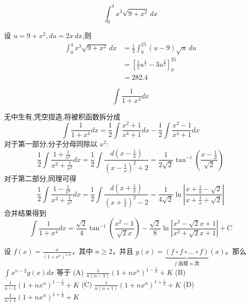 \begin{questions}
    \question
    \[
    \int_{0}^{4} x^3 \sqrt{9+x^2} \,dx
    \]
    \begin{solution}
        设 $u = 9+x^2, du = 2x \,dx$,则
        \begin{align*}
        \int_{0}^{4} x^3 \sqrt{9+x^2}\,dx 
        &= \frac{1}{2} \int_{9}^{25} (u-9) \sqrt{u}\, du \\
        &= \left[ \frac{1}{5}u^{\frac{5}{2}} - 3u^{\frac{3}{2}} \right]_{9}^{25} \\
        &= 282.4
        \end{align*}
    \end{solution}

    \question
    \[ 
    \int \frac{1}{1+x^4} dx 
    \]
    \begin{solution}
        无中生有,凭空捏造,将被积函数拆分成
        \[ 
        \int \frac{1}{1+x^4} dx = \frac{1}{2} \int \frac{x^2+1}{x^4+1} dx - \frac{1}{2} \int \frac{x^2-1}{x^4+1} dx 
        \]
        对于第一部分,分子分母同除以 $x^2$:
        \[ 
        \frac{1}{2} \int \frac{1+\frac{1}{x^2}}{x^2+\frac{1}{x^2}} dx 
        = \frac{1}{2} \int \frac{d(x-\frac{1}{x})}{(x-\frac{1}{x})^2+2}
        = \frac{1}{2\sqrt{2}} \tan^{-1}\left(\frac{x-\frac{1}{x}}{\sqrt{2}}\right) 
        \]
        对于第二部分,同理可得
        \[ 
        \frac{1}{2} \int \frac{1-\frac{1}{x^2}}{x^2+\frac{1}{x^2}} dx 
        = \frac{1}{2} \int \frac{d(x+\frac{1}{x})}{(x+\frac{1}{x})^2-2} 
        = \frac{1}{4\sqrt{2}} \ln\left| \frac{x+\frac{1}{x}-\sqrt{2}}{x+\frac{1}{x}+\sqrt{2}} \right| 
        \]
        合并结果得到
        \[ 
        \int \frac{1}{1+x^4} dx 
        = \frac{\sqrt{2}}{4} \tan^{-1}\left(\frac{x^2-1}{\sqrt{2}x}\right) - \frac{\sqrt{2}}{8} \ln\left| \frac{x^2-\sqrt{2}x+1}{x^2+\sqrt{2}x+1} \right| + C 
        \]
    \end{solution}

    \question
设 $f(x) = \frac{x}{\left( 1 + x^n \right)^{1/n}}$，其中 $n \ge 2$，并且 $g(x) = \underbrace{(f \circ f \circ \dots \circ f)}_{f \text{ 出现 } n \text{ 次}} (x)$。那么 $\int x^{n-2} g(x) dx$ 等于
(A) $\frac{1}{n(n-1)} \left( 1 + nx^n \right)^{1 - \frac{1}{n}} + K$
(B) $\frac{1}{n-1} \left( 1 + nx^n \right)^{1 - \frac{1}{n}} + K$
(C) $\frac{1}{n(n+1)} \left( 1 + nx^n \right)^{1 + \frac{1}{n}} + K$
(D) $\frac{1}{n+1} \left( 1 + nx^n \right)^{1 + \frac{1}{n}} + K$


\end{questions}
